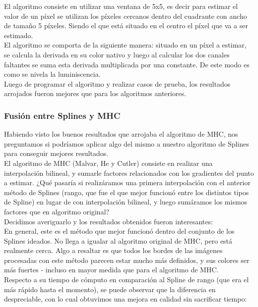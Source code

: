 \documentclass[a4paper]{article}
\begin{document}
El algoritmo consiste en utilizar una ventana de 5x5, es decir para estimar el valor de un p\'ixel se utilizan los p\'ixeles cercanos dentro del cuadrante con ancho de tama\~no 5 p\'ixeles. Siendo el que est\'a situado en el centro el p\'ixel que va a ser estimado.\\

El algoritmo se comporta de la siguiente manera: situado en un p\'ixel a estimar, se calcula la derivada en su color nativo y luego al calcular los dos canales faltantes se suma esta derivada multiplicada por una constante. De este modo es como se nivela la luminiscencia.\\

Luego de programar el algoritmo y realizar casos de prueba, los resultados arrojados fueron mejores que para los algoritmos anteriores.\\

\subsubsection*{Fusi\'on entre Splines y MHC}

Habiendo visto los buenos resultados que arrojaba el algoritmo de MHC, nos preguntamos si podríamos aplicar algo del mismo a nuestro algoritmo de Splines para conseguir mejores resultados.\\

El algoritmo de MHC (Malvar, He y Cutler) consiste en realizar una interpolación bilineal, y sumarle factores relacionados con los gradientes del punto a estimar. ¿Qué pasaría si realizáramos una primera interpolación con el anterior método de Splines (rango, que fue el que mejor funcionó entre los distintos tipos de Spline) en lugar de con interpolación bilineal, y luego sumáramos los mismos factores que en algoritmo original?\\

Decidimos averiguarlo y los resultados obtenidos fueron interesantes:\\

En general, este es el método que mejor funcionó dentro del conjunto de los Splines ideados. No llega a igualar al algoritmo original de MHC, pero está realmente cerca. Algo a resaltar es que todos los bordes de las imágenes procesadas con este método parecen estar mucho más definidos, y sus colores ser más fuertes - incluso en mayor medida que para el algoritmo de MHC.\\

Respecto a su tiempo de cómputo en comparación al Spline de rango (que era el más rápido hasta el momento), se puede observar que la diferencia en despreciable, con lo cual obtuvimos una mejora en calidad sin sacrificar tiempo:\\
\end{document}
